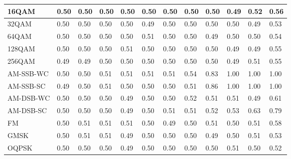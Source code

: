 \documentclass[conference]{IEEEtran}
\begin{document}
\begin{table}
\begin{tabular}{|l|l|l|l|l|l|l|l|l|l|l|l|}
\hline 16QAM & 0.50 & 0.50 & 0.50 & 0.50 & 0.50 & 0.50 & 0.50 & 0.50 & 0.49 & 0.52 & 0.56\\ 
\hline 32QAM & 0.50 & 0.50 & 0.50 & 0.50 & 0.49 & 0.50 & 0.50 & 0.50 & 0.50 & 0.49 & 0.53\\ 
\hline 64QAM & 0.50 & 0.50 & 0.50 & 0.50 & 0.51 & 0.50 & 0.50 & 0.49 & 0.50 & 0.50 & 0.54\\ 
\hline 128QAM & 0.50 & 0.50 & 0.50 & 0.51 & 0.50 & 0.50 & 0.50 & 0.50 & 0.49 & 0.49 & 0.55\\ 
\hline 256QAM & 0.49 & 0.49 & 0.50 & 0.50 & 0.50 & 0.50 & 0.50 & 0.50 & 0.49 & 0.51 & 0.55\\ 
\hline AM-SSB-WC & 0.50 & 0.50 & 0.51 & 0.51 & 0.51 & 0.51 & 0.54 & 0.83 & 1.00 & 1.00 & 1.00\\ 
\hline AM-SSB-SC & 0.49 & 0.50 & 0.51 & 0.50 & 0.50 & 0.50 & 0.51 & 0.86 & 1.00 & 1.00 & 1.00 \\ 
\hline AM-DSB-WC & 0.50 & 0.50 & 0.50 & 0.49 & 0.50 & 0.50 & 0.52 & 0.51 & 0.51 & 0.49 & 0.61\\ 
\hline AM-DSB-SC & 0.50 & 0.50 & 0.50 & 0.49 & 0.50 & 0.51 & 0.51 & 0.52 & 0.53 & 0.63 & 0.79\\ 
\hline FM  & 0.50 & 0.51 & 0.51 & 0.51 & 0.50 & 0.49 & 0.50 & 0.51 & 0.50 & 0.51 & 0.58\\ 
\hline GMSK & 0.50 & 0.51 & 0.51 & 0.49 & 0.50 & 0.50 & 0.50 & 0.49 & 0.50 & 0.51 & 0.53\\ 
\hline OQPSK & 0.50 & 0.50 & 0.50 & 0.49 & 0.50 & 0.50 & 0.50 & 0.50 & 0.51 & 0.50 & 0.52\\
\hline
\end{tabular}
\label{CHAODA AUC Scores -20 to 0}
\end{table}
\end{document}
